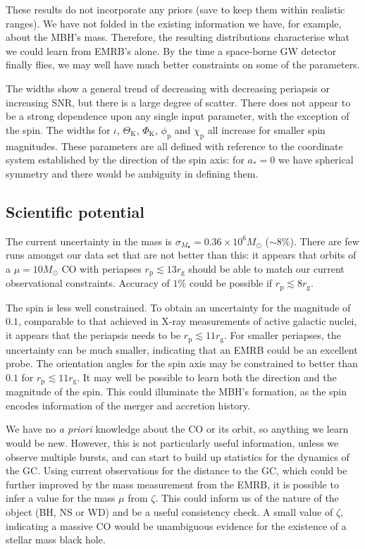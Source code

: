 \documentclass[11pt,twoside]{article}
\begin{document}
These results do not incorporate any priors (save to keep them within realistic ranges). We have not folded in the existing information we have, for example, about the MBH's mass. Therefore, the resulting distributions characterise what we could learn from EMRB's alone. By the time a space-borne GW detector finally flies, we may well have much better constraints on some of the parameters.

The widths show a general trend of decreasing with decreasing periapsis or increasing SNR, but there is a large degree of scatter. There does not appear to be a strong dependence upon any single input parameter, with the exception of the spin. The widths for $\iota$, $\Theta_\mathrm{K}$, $\Phi_\mathrm{K}$, $\phi_\mathrm{p}$ and $\chi_\mathrm{p}$ all increase for smaller spin magnitudes. These parameters are all defined with reference to the coordinate system established by the direction of the spin axis: for $a_\ast = 0$ we have spherical symmetry and there would be ambiguity in defining them.

\subsection{Scientific potential}

The current uncertainty in the mass is $\sigma_{M_\bullet} = 0.36 \times 10^6 M_\odot$ ($\sim 8\%$). There are few runs amongst our data set that are not better than this: it appears that orbits of a $\mu = 10 M_\odot$ CO with periapses $r_\mathrm{p} \lesssim 13 r_\mathrm{g}$ should be able to match our current observational constraints. Accuracy of $1\%$ could be possible if $r_\mathrm{p} \lesssim 8 r_\mathrm{g}$.

The spin is less well constrained. To obtain an uncertainty for the magnitude of $0.1$, comparable to that achieved in X-ray measurements of active galactic nuclei, it appears that the periapsis needs to be $r_\mathrm{p} \lesssim 11 r_\mathrm{g}$. For smaller periapses, the uncertainty can be much smaller, indicating that an EMRB could be an excellent probe. The orientation angles for the spin axis may be constrained to better than $0.1$ for $r_\mathrm{p} \lesssim 11 r_\mathrm{g}$. It may well be possible to learn both the direction and the magnitude of the spin. This could illuminate the MBH's formation, as the spin encodes information of the merger and accretion history.

We have no {\it a priori} knowledge about the CO or its orbit, so anything we learn would be new. However, this is not particularly useful information, unless we observe multiple bursts, and can start to build up statistics for the dynamics of the GC. Using current observations for the distance to the GC, which could be further improved by the mass measurement from the EMRB, it is possible to infer a value for the mass $\mu$ from $\zeta$. This could inform us of the nature of the object (BH, NS or WD) and be a useful consistency check. A small value of $\zeta$, indicating a massive CO would be unambiguous evidence for the existence of a stellar mass black hole.



\end{document}
